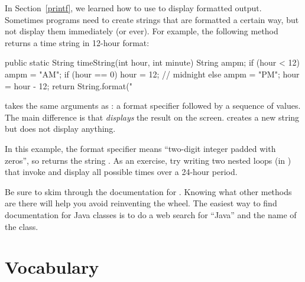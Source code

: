 
In Section~\ref{printf}, we learned how to use  to display formatted output.
Sometimes programs need to create strings that are formatted a certain way, but not display them immediately (or ever).
For example, the following method returns a time string in 12-hour format:

\begin{code}
public static String timeString(int hour, int minute) {
    String ampm;
    if (hour < 12) {
        ampm = "AM";
        if (hour == 0) {
            hour = 12;  // midnight
        }
    } else {
        ampm = "PM";
        hour = hour - 12;
    }
    return String.format("%
}
\end{code}


 takes the same arguments as : a format specifier followed by a sequence of values.
The main difference is that  {\em displays} the result on the screen.
 creates a new string but does not display anything.

In this example, the format specifier  means ``two-digit integer padded with zeros'', so  returns the string .
As an exercise, try writing two nested  loops (in ) that invoke  and display all possible times over a 24-hour period.

Be sure to skim through the documentation for .
Knowing what other methods are there will help you avoid reinventing the wheel.
The easiest way to find documentation for Java classes is to do a web search for ``Java'' and the name of the class.


\section{Vocabulary}

